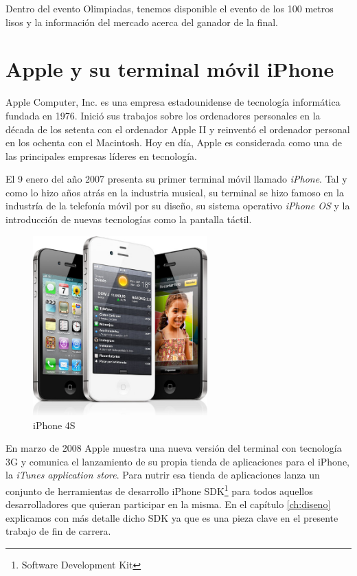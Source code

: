  Dentro del evento Olimpiadas, tenemos disponible el evento de los 100 metros lisos y la información del mercado acerca del ganador de la final.
 
\section{Apple y su terminal móvil iPhone}
 
Apple Computer, Inc. es una empresa estadounidense de tecnología informática fundada en 1976. Inició sus trabajos sobre los ordenadores personales en la década de los setenta con el ordenador Apple II y reinventó el ordenador personal en los ochenta con el Macintosh. Hoy en día, Apple es considerada como una de las principales empresas líderes en tecnología.

El 9 enero del año 2007 presenta su primer terminal móvil llamado \emph{iPhone}. Tal y como lo hizo años atrás en la industria musical, su terminal se hizo famoso en la industría de la telefonía móvil por su diseño, su sistema operativo \emph{iPhone OS} y la introducción de nuevas tecnologías como la pantalla táctil.

\begin{figure} [h]
  \centering
    \includegraphics[width=0.6\textwidth]{./images/iphone4.jpg} 
  \caption{iPhone 4S}
  \label{fig:iPhone-4GS}
\end{figure}
  
  En marzo de 2008 Apple muestra una nueva versión del terminal con tecnología 3G y comunica el lanzamiento de su propia tienda de aplicaciones para el iPhone, la \emph{iTunes application store}. Para nutrir esa tienda de aplicaciones  lanza un conjunto de herramientas de desarrollo iPhone SDK\footnote{Software Development Kit} para todos aquellos desarrolladores que quieran participar en la misma. En el capítulo \ref{ch:diseno}  explicamos con más detalle dicho SDK ya que es una pieza clave en el presente trabajo de fin de carrera.
  
